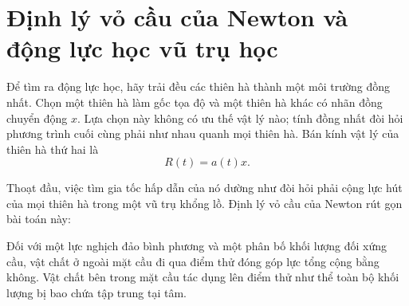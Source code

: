 \begin{classroomqa}
\end{classroomqa}

\begin{classroomqa}
\end{classroomqa}

\section{Định lý vỏ cầu của Newton và động lực học vũ trụ học}

Để tìm ra động lực học, hãy trải đều các thiên hà thành một môi trường đồng nhất. Chọn một thiên hà làm gốc tọa độ và một thiên hà khác có nhãn đồng chuyển động \(x\). Lựa chọn này không có ưu thế vật lý nào; tính đồng nhất đòi hỏi phương trình cuối cùng phải như nhau quanh mọi thiên hà. Bán kính vật lý của thiên hà thứ hai là
\begin{equation}
  R(t)=a(t)x.
  \label{eq:radius-ax}
\end{equation}

Thoạt đầu, việc tìm gia tốc hấp dẫn của nó dường như đòi hỏi phải cộng lực hút của mọi thiên hà trong một vũ trụ khổng lồ. Định lý vỏ cầu của Newton rút gọn bài toán này:

\begin{proposition}
Đối với một lực nghịch đảo bình phương và một phân bố khối lượng đối xứng cầu, vật chất ở ngoài mặt cầu đi qua điểm thử đóng góp lực tổng cộng bằng không. Vật chất bên trong mặt cầu tác dụng lên điểm thử như thể toàn bộ khối lượng bị bao chứa tập trung tại tâm.
\end{proposition}

